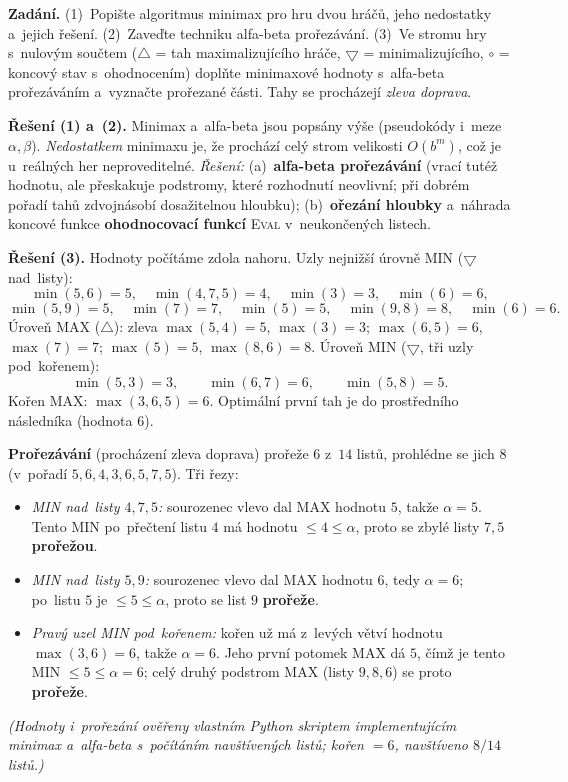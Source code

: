 \begin{priklad}
\par
\textbf{Zadání.} (1)~Popište algoritmus minimax pro hru dvou hráčů, jeho nedostatky a~jejich řešení. (2)~Zaveďte techniku alfa-beta prořezávání. (3)~Ve stromu hry s~nulovým součtem ($\bigtriangleup$ = tah maximalizujícího hráče, $\bigtriangledown$ = minimalizujícího, $\circ$ = koncový stav s~ohodnocením) doplňte minimaxové hodnoty s~alfa-beta prořezáváním a~vyznačte prořezané části. Tahy se procházejí \emph{zleva doprava}.

\medskip
\textbf{Řešení (1) a~(2).} Minimax a~alfa-beta jsou popsány výše (pseudokódy i~meze $\alpha,\beta$). \emph{Nedostatkem} minimaxu je, že prochází celý strom velikosti $O(b^m)$, což je u~reálných her neproveditelné. \emph{Řešení:} (a)~\textbf{alfa-beta prořezávání} (vrací tutéž hodnotu, ale přeskakuje podstromy, které rozhodnutí neovlivní; při dobrém pořadí tahů zdvojnásobí dosažitelnou hloubku); (b)~\textbf{ořezání hloubky} a~náhrada koncové funkce \textbf{ohodnocovací funkcí} \textsc{Eval} v~neukončených listech.

\medskip
\textbf{Řešení (3).} Hodnoty počítáme zdola nahoru. Uzly nejnižší úrovně MIN ($\bigtriangledown$ nad~listy):
\[
\min(5,6)=5,\quad \min(4,7,5)=4,\quad \min(3)=3,\quad \min(6)=6,
\]
\[
\min(5,9)=5,\quad \min(7)=7,\quad \min(5)=5,\quad \min(9,8)=8,\quad \min(6)=6.
\]
Úroveň MAX ($\bigtriangleup$): zleva $\max(5,4)=5$, $\max(3)=3$; $\max(6,5)=6$, $\max(7)=7$; $\max(5)=5$, $\max(8,6)=8$. Úroveň MIN ($\bigtriangledown$, tři uzly pod~kořenem):
\[
\min(5,3)=3,\qquad \min(6,7)=6,\qquad \min(5,8)=5.
\]
Kořen MAX: $\max(3,6,5)=\boxed{6}$. Optimální první tah je do prostředního následníka (hodnota $6$).

\textbf{Prořezávání} (procházení zleva doprava) prořeže $6$ z~$14$ listů, prohlédne se jich $8$ (v~pořadí $5,6,4,3,6,5,7,5$). Tři řezy:
\begin{itemize}
  \item \emph{MIN nad~listy $4,7,5$:} sourozenec vlevo dal MAX hodnotu $5$, takže $\alpha=5$. Tento MIN po~přečtení listu $4$ má hodnotu $\le 4 \le \alpha$, proto se zbylé listy $7,5$ \textbf{prořežou}.
  \item \emph{MIN nad~listy $5,9$:} sourozenec vlevo dal MAX hodnotu $6$, tedy $\alpha=6$; po~listu $5$ je $\le 5 \le \alpha$, proto se list $9$ \textbf{prořeže}.
  \item \emph{Pravý uzel MIN pod~kořenem:} kořen už má z~levých větví hodnotu $\max(3,6)=6$, takže $\alpha=6$. Jeho první potomek MAX dá $5$, čímž je tento MIN $\le 5 \le \alpha=6$; celý druhý podstrom MAX (listy $9,8,6$) se proto \textbf{prořeže}.
\end{itemize}
\emph{(Hodnoty i~prořezání ověřeny vlastním Python skriptem implementujícím minimax a~alfa-beta s~počítáním navštívených listů; kořen $=6$, navštíveno $8/14$ listů.)}


\end{priklad}
